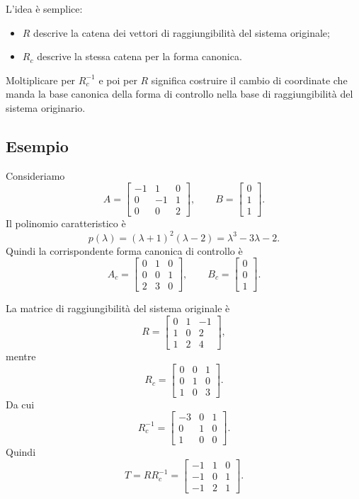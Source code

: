 L’idea è semplice:
\begin{itemize}
    \item \(R\) descrive la catena dei vettori di raggiungibilità del sistema originale;
    \item \(R_c\) descrive la stessa catena per la forma canonica.
\end{itemize}

Moltiplicare per \(R_c^{-1}\) e poi per \(R\) significa costruire il cambio di coordinate che manda la base canonica della forma di controllo nella base di raggiungibilità del sistema originario.

\subsection{Esempio}

Consideriamo
\[
A=
\begin{bmatrix}
-1 & 1 & 0\\
0 & -1 & 1\\
0 & 0 & 2
\end{bmatrix},
\qquad
B=
\begin{bmatrix}
0\\1\\1
\end{bmatrix}.
\]
Il polinomio caratteristico è
\[
p(\lambda)=(\lambda+1)^2(\lambda-2)=\lambda^3-3\lambda-2.
\]
Quindi la corrispondente forma canonica di controllo è
\[
A_c=
\begin{bmatrix}
0 & 1 & 0\\
0 & 0 & 1\\
2 & 3 & 0
\end{bmatrix},
\qquad
B_c=
\begin{bmatrix}
0\\0\\1
\end{bmatrix}.
\]

La matrice di raggiungibilità del sistema originale è
\[
R=
\begin{bmatrix}
0 & 1 & -1\\
1 & 0 & 2\\
1 & 2 & 4
\end{bmatrix},
\]
mentre
\[
R_c=
\begin{bmatrix}
0 & 0 & 1\\
0 & 1 & 0\\
1 & 0 & 3
\end{bmatrix}.
\]
Da cui
\[
R_c^{-1}=
\begin{bmatrix}
-3 & 0 & 1\\
0 & 1 & 0\\
1 & 0 & 0
\end{bmatrix}.
\]
Quindi
\[
T=RR_c^{-1}
=
\begin{bmatrix}
-1 & 1 & 0\\
-1 & 0 & 1\\
-1 & 2 & 1
\end{bmatrix}.
\]

